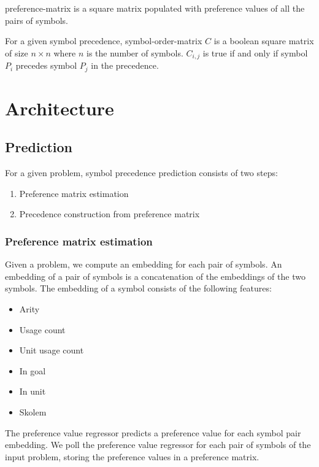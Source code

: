 \Gls{preference-matrix} is a square matrix populated with preference values of all the pairs of symbols.

For a given symbol precedence,
\gls{symbol-order-matrix} \(C\) is a boolean square matrix of size \(n \times n\) where \(n\) is the number of symbols.
\(C_{i, j}\) is true if and only if symbol \(P_i\) precedes symbol \(P_j\) in the precedence.

\section{Architecture}

\subsection{Prediction}

For a given problem, symbol precedence prediction consists of two steps:

\begin{enumerate}
	\item Preference matrix estimation
	\item Precedence construction from preference matrix
\end{enumerate}


\subsubsection{Preference matrix estimation}

Given a problem, we compute an embedding for each pair of symbols.
An embedding of a pair of symbols is a concatenation of the embeddings of the two symbols.
The embedding of a symbol consists of the following features:

\begin{itemize}
	\item Arity
	\item Usage count
	\item Unit usage count
	\item In goal
	\item In unit
	\item Skolem
\end{itemize}

The preference value regressor predicts a preference value for each symbol pair embedding.
We poll the preference value regressor for each pair of symbols of the input problem,
storing the preference values in a preference matrix.

